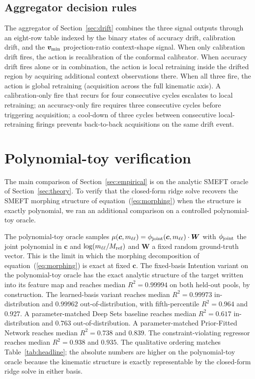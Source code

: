 \documentclass[11pt,a4paper]{article}
\newcommand{\mll}{m_{\ell\ell}}
\newcommand{\Mref}{M_{\rm ref}}
\begin{document}
\subsection{Aggregator decision rules}

The aggregator of Section~\ref{sec:drift} combines the three signal outputs through an eight-row table indexed by the binary states of accuracy drift, calibration drift, and the $\bm{v}_{\rm min}$ projection-ratio context-shape signal. When only calibration drift fires, the action is recalibration of the conformal calibrator. When accuracy drift fires alone or in combination, the action is local retraining inside the drifted region by acquiring additional context observations there. When all three fire, the action is global retraining (acquisition across the full kinematic axis). A calibration-only fire that recurs for four consecutive cycles escalates to local retraining; an accuracy-only fire requires three consecutive cycles before triggering acquisition; a cool-down of three cycles between consecutive local-retraining firings prevents back-to-back acquisitions on the same drift event.

\section{Polynomial-toy verification}
\label{app:toy}

The main comparison of Section~\ref{sec:empirical} is on the analytic SMEFT oracle of Section~\ref{sec:theory}. To verify that the closed-form ridge solve recovers the SMEFT morphing structure of equation~(\ref{eq:morphing}) when the structure is exactly polynomial, we ran an additional comparison on a controlled polynomial-toy oracle.

The polynomial-toy oracle samples $\mu(\bm{c}, \mll) = \phi_{\rm joint}(\bm{c}, \mll) \cdot \bm{W}$ with $\phi_{\rm joint}$ the joint polynomial in $\bm{c}$ and $\log(\mll/\Mref)$ and $\bm{W}$ a fixed random ground-truth vector. This is the limit in which the morphing decomposition of equation~(\ref{eq:morphing}) is exact at fixed $\bm{c}$. The fixed-basis Intention variant on the polynomial-toy oracle has the exact analytic structure of the target written into its feature map and reaches median $R^2 = 0.99994$ on both held-out pools, by construction. The learned-basis variant reaches median $R^2 = 0.99973$ in-distribution and $0.99962$ out-of-distribution, with fifth-percentile $R^2 = 0.964$ and $0.927$. A parameter-matched Deep Sets baseline reaches median $R^2 = 0.617$ in-distribution and $0.763$ out-of-distribution. A parameter-matched Prior-Fitted Network reaches median $R^2 = 0.738$ and $0.839$. The constraint-violating regressor reaches median $R^2 = 0.938$ and $0.935$. The qualitative ordering matches Table~\ref{tab:headline}; the absolute numbers are higher on the polynomial-toy oracle because the kinematic structure is exactly representable by the closed-form ridge solve in either basis.
\end{document}
